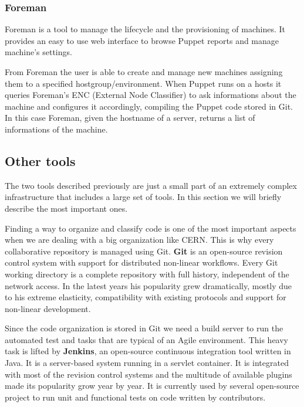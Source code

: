 \subsubsection{Foreman}

Foreman \cite{ForemanWebsite} is a tool to manage the lifecycle and the
provisioning of machines. It provides an easy to use web interface to
browse Puppet reports and manage machine's settings.

From Foreman the user is able to create and manage new machines assigning
them to a specified hostgroup/environment. When Puppet runs on a hosts it
queries Foreman's ENC (External Node Classifier) \cite{WhatIsENC} to ask
informations about the machine and configures it accordingly, compiling
the Puppet code stored in Git. In this case Foreman, given the hostname of
a server, returns a list of informations of the machine.

\subsection{Other tools}

The two tools described previously are just a small part of an extremely
complex infrastructure that includes a large set of tools. In this section
we will briefly describe the most important ones.

Finding a way to organize and classify code is one of the most important
aspects when we are dealing with a big organization like CERN. This is why
every collaborative repository is managed using Git. \textbf{Git}
\cite{GitWebsite} is an open-source revision control system with support
for distributed non-linear workflows. Every Git working directory is
a complete repository with full history, independent of the network
access. In the latest years his popularity grew dramatically, mostly due
to his extreme elasticity, compatibility with existing protocols and
support for non-linear development.

Since the code organization is stored in Git we need a build server to run
the automated test and tasks that are typical of an Agile environment.
This heavy task is lifted by \textbf{Jenkins}, an open-source continuous
integration tool written in Java. It is a server-based system running in
a servlet container. It is integrated with most of the revision control
systems and the multitude of available plugins made its popularity grow
year by year. It is currently used by several open-source project to run
unit and functional tests on code written by contributors.

